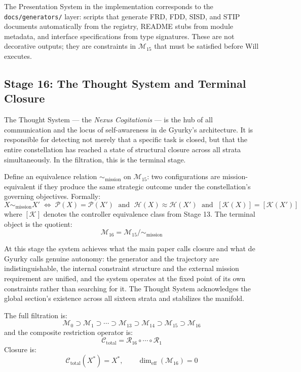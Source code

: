\documentclass[11pt, oneside]{article}
\begin{document}
The Presentation System in the implementation corresponds to the \texttt{docs/generators/}
layer: scripts that generate FRD, FDD, SISD, and STIP documents automatically from the
registry, README stubs from module metadata, and interface specifications from type
signatures. These are not decorative outputs; they are constraints in $\mathcal{M}_{15}$
that must be satisfied before Will executes.

\subsection{Stage 16: The Thought System and Terminal Closure}

The Thought System --- the \emph{Nexus Cogitationis} --- is the hub of all communication
and the locus of self-awareness in de Gyurky's architecture. It is responsible for
detecting not merely that a specific task is closed, but that the entire constellation
has reached a state of structural closure across all strata simultaneously. In the
filtration, this is the terminal stage.

Define an equivalence relation $\sim_{\mathrm{mission}}$ on $\mathcal{M}_{15}$: two
configurations are mission-equivalent if they produce the same strategic outcome under
the constellation's governing objectives. Formally:
\[
X \sim_{\mathrm{mission}} X'
\;\Longleftrightarrow\;
\mathcal{P}(X) = \mathcal{P}(X') \;\text{ and }\;
\mathcal{H}(X) \approx \mathcal{H}(X')
\;\text{ and }\;
[\mathcal{K}(X)] = [\mathcal{K}(X')]
\]
where $[\mathcal{K}]$ denotes the controller equivalence class from Stage 13. The terminal
object is the quotient:
\[
\mathcal{M}_{16} = \mathcal{M}_{15} / \sim_{\mathrm{mission}}
\]

At this stage the system achieves what the main paper calls closure and what de Gyurky
calls genuine autonomy: the generator and the trajectory are indistinguishable, the
internal constraint structure and the external mission requirement are unified, and the
system operates at the fixed point of its own constraints rather than searching for it.
The Thought System acknowledges the global section's existence across all sixteen strata
and stabilizes the manifold.

The full filtration is:
\[
\mathcal{M}_0 \supset \mathcal{M}_1 \supset \cdots \supset \mathcal{M}_{13}
\supset \mathcal{M}_{14} \supset \mathcal{M}_{15} \supset \mathcal{M}_{16}
\]
and the composite restriction operator is:
\[
\mathcal{C}_{\mathrm{total}} = \mathcal{R}_{16} \circ \cdots \circ \mathcal{R}_1
\]
Closure is:
\[
\mathcal{C}_{\mathrm{total}}(X^*) = X^*, \qquad \dim_{\mathrm{eff}}(\mathcal{M}_{16}) = 0
\]
\end{document}
